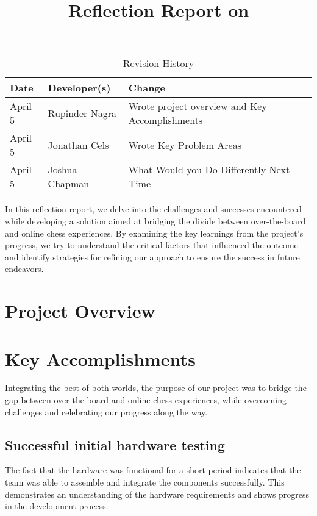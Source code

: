 \documentclass{article}
\title{Reflection Report on \progname}
\author{\authname}
\date{}
\begin{document}
\begin{table}[hp]
\caption{Revision History} \label{TblRevisionHistory}
\begin{tabularx}{\textwidth}{llX}
\toprule
\textbf{Date} & \textbf{Developer(s)} & \textbf{Change}\\
\midrule
April 5 & Rupinder Nagra & Wrote project overview and Key Accomplishments\\
April 5 & Jonathan Cels & Wrote Key Problem Areas\\
April 5 & Joshua Chapman & What Would you Do Differently Next Time\\
\bottomrule
\end{tabularx}
\end{table}

\newpage

\maketitle

In this reflection report, we delve into the challenges and successes encountered while developing a solution aimed at bridging the divide between over-the-board and online chess experiences. By examining the key learnings from the project's progress, we try to understand the critical factors that influenced the outcome and identify strategies for refining our approach to ensure the success in future endeavors.

\section{Project Overview}
\projectoverview

\section{Key Accomplishments}

Integrating the best of both worlds, the purpose of our project was to bridge the gap between over-the-board and online chess experiences, while overcoming challenges and celebrating our progress along the way.

\subsection{Successful initial hardware testing}
The fact that the hardware was functional for a short period indicates that the team was able to assemble and integrate the components successfully. This demonstrates an understanding of the hardware requirements and shows progress in the development process.
\end{document}
